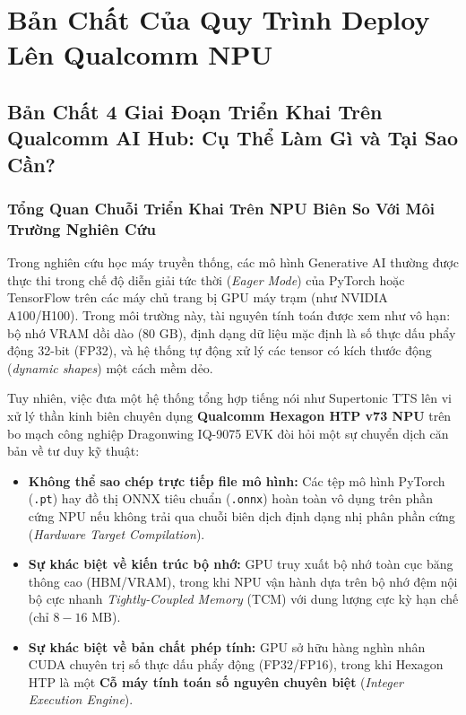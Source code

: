\documentclass[11pt,a4paper,oneside,table]{report}
\begin{document}
\part{Bản Chất Của Quy Trình Deploy Lên Qualcomm NPU}

\chapter{Bản Chất 4 Giai Đoạn Triển Khai Trên Qualcomm AI Hub: Cụ Thể Làm Gì và Tại Sao Cần?}
\label{chap:deploy_essence}

\section{Tổng Quan Chuỗi Triển Khai Trên NPU Biên So Với Môi Trường Nghiên Cứu}
\label{sec:deploy_overview}

Trong nghiên cứu học máy truyền thống, các mô hình Generative AI thường được thực thi trong chế độ diễn giải tức thời (\textit{Eager Mode}) của PyTorch hoặc TensorFlow trên các máy chủ trang bị GPU máy trạm (như NVIDIA A100/H100). Trong môi trường này, tài nguyên tính toán được xem như vô hạn: bộ nhớ VRAM dồi dào ($80\text{ GB}$), định dạng dữ liệu mặc định là số thực dấu phẩy động 32-bit (FP32), và hệ thống tự động xử lý các tensor có kích thước động (\textit{dynamic shapes}) một cách mềm dẻo.

Tuy nhiên, việc đưa một hệ thống tổng hợp tiếng nói như Supertonic TTS lên vi xử lý thần kinh biên chuyên dụng \textbf{Qualcomm Hexagon HTP v73 NPU} trên bo mạch công nghiệp Dragonwing IQ-9075 EVK đòi hỏi một sự chuyển dịch căn bản về tư duy kỹ thuật:
\begin{itemize}
    \item \textbf{Không thể sao chép trực tiếp file mô hình:} Các tệp mô hình PyTorch (\texttt{.pt}) hay đồ thị ONNX tiêu chuẩn (\texttt{.onnx}) hoàn toàn vô dụng trên phần cứng NPU nếu không trải qua chuỗi biên dịch định dạng nhị phân phần cứng (\textit{Hardware Target Compilation}).
    \item \textbf{Sự khác biệt về kiến trúc bộ nhớ:} GPU truy xuất bộ nhớ toàn cục băng thông cao (HBM/VRAM), trong khi NPU vận hành dựa trên bộ nhớ đệm nội bộ cực nhanh \textit{Tightly-Coupled Memory} (TCM) với dung lượng cực kỳ hạn chế (chỉ $8 - 16\text{ MB}$).
    \item \textbf{Sự khác biệt về bản chất phép tính:} GPU sở hữu hàng nghìn nhân CUDA chuyên trị số thực dấu phẩy động (FP32/FP16), trong khi Hexagon HTP là một \textbf{Cỗ máy tính toán số nguyên chuyên biệt} (\textit{Integer Execution Engine}).
\end{itemize}
\end{document}
